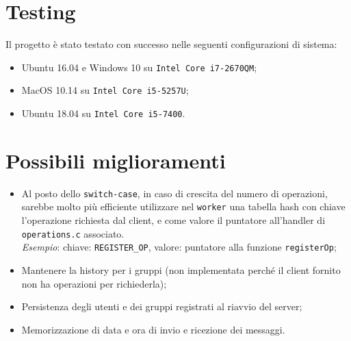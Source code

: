 \section{Testing}
Il progetto è stato testato con successo nelle seguenti configurazioni di sistema:
\begin{itemize}
	\item Ubuntu 16.04 e Windows 10 su \texttt{Intel Core i7-2670QM};
	\item MacOS 10.14 su \texttt{Intel Core i5-5257U};
	\item Ubuntu 18.04 su \texttt{Intel Core i5-7400}.
\end{itemize}


\section{Possibili miglioramenti}
\begin{itemize}
	\item Al posto dello \texttt{switch-case}, in caso di crescita del numero di operazioni, sarebbe molto più efficiente utilizzare nel \texttt{worker} una tabella hash con chiave l'operazione richiesta dal client, e come valore il puntatore all'handler di \texttt{operations.c} associato.\\
	\textit{Esempio}: chiave: \texttt{REGISTER\_OP}, valore: puntatore alla funzione \texttt{registerOp};
	\item Mantenere la history per i gruppi (non implementata perché il client fornito non ha operazioni per richiederla);
	\item Persistenza degli utenti e dei gruppi registrati al riavvio del server;
	\item Memorizzazione di data e ora di invio e ricezione dei messaggi.
\end{itemize}
